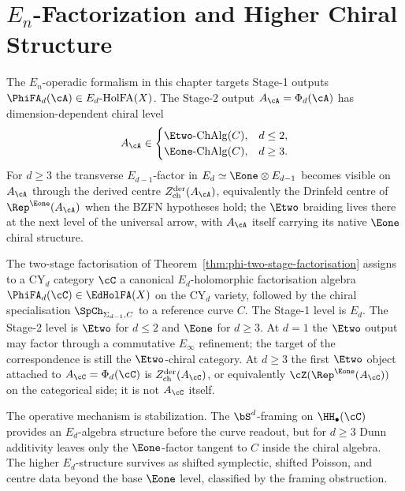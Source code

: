 \chapter{\texorpdfstring{$E_n$}{E-n}-Factorization and Higher Chiral Structure}
\label{ch:en-factorization}

\providecommand{\bY}{\mathbb{Y}}
\providecommand{\DR}{\mathrm{DR}}
\providecommand{\Env}{\mathrm{Env}}

\begin{remark}
\label{rem:en-factorization-stage1-target}
The $E_n$-operadic formalism in this chapter targets Stage-1 outputs
$\PhiFA_d(\cA) \in E_d\text{-HolFA}(X)$. The Stage-2 output
$A_\cA=\Phi_d(\cA)$ has dimension-dependent chiral level
\[
 A_\cA\in
 \begin{cases}
 \Etwo\text{-}\mathrm{ChAlg}(C), & d\leq 2,\\
 \Eone\text{-}\mathrm{ChAlg}(C), & d\geq 3.
 \end{cases}
\]
For $d\geq3$ the transverse $E_{d-1}$-factor in
$E_d\simeq \Eone\otimes E_{d-1}$ becomes visible on $A_\cA$ through
the derived centre $Z^{\mathrm{der}}_{\mathrm{ch}}(A_\cA)$, equivalently
the Drinfeld centre of $\Rep^{\Eone}(A_\cA)$ when the BZFN hypotheses
hold; the $\Etwo$ braiding lives there at the next level of the
universal arrow, with $A_\cA$ itself carrying its native $\Eone$
chiral structure.
\end{remark}

The two-stage factorisation of Theorem~\ref{thm:phi-two-stage-factorisation}
assigns to a CY$_d$ category $\cC$ a canonical $E_d$-holomorphic
factorisation algebra $\PhiFA_d(\cC) \in \EdHolFA(X)$ on the CY$_d$
variety, followed by the chiral specialisation
$\SpCh_{\Sigma_{d-1}, C}$ to a reference curve $C$.  The Stage-1 level
is $E_d$.  The Stage-2 level is $\Etwo$ for $d\leq2$ and $\Eone$ for
$d\geq3$.  At $d=1$ the $\Etwo$ output may factor through a
commutative $E_\infty$ refinement; the target of the correspondence is
still the $\Etwo$-chiral category.  At $d\geq3$ the first $\Etwo$
object attached to $A_\cC=\Phi_d(\cC)$ is
$Z^{\mathrm{der}}_{\mathrm{ch}}(A_\cC)$, or equivalently
$\cZ(\Rep^{\Eone}(A_\cC))$ on the categorical side; it is not
$A_\cC$ itself.

The operative mechanism is stabilization. The $\bS^d$-framing on
$\HH_\bullet(\cC)$ provides an $E_d$-algebra structure before the curve
readout, but for $d \geq 3$ Dunn additivity leaves only the
$\Eone$-factor tangent to $C$ inside the chiral algebra. The higher
$E_d$-structure survives as shifted symplectic, shifted Poisson, and
centre data beyond the base $\Eone$ level, classified by the framing
obstruction.

